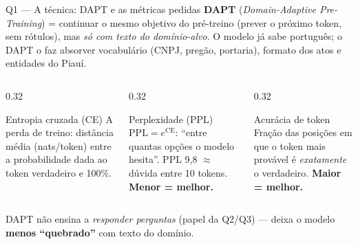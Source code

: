 \documentclass[10pt,aspectratio=169]{beamer}
\begin{document}
\begin{frame}{Q1 — A técnica: DAPT e as métricas pedidas}
  \textbf{DAPT} (\emph{Domain-Adaptive Pre-Training}) = continuar o mesmo objetivo do pré-treino
  (prever o próximo token, sem rótulos), mas \emph{só com texto do domínio-alvo}.
  O modelo já sabe português; o DAPT o faz absorver vocabulário (CNPJ, pregão, portaria),
  formato dos atos e entidades do Piauí.
  \vspace{6pt}
  \begin{columns}[T]
    \begin{column}{0.32\textwidth}
      \begin{block}{Entropia cruzada (CE)}
        \small A perda de treino: distância média (nats/token) entre a probabilidade dada ao token verdadeiro e 100\%.
      \end{block}
    \end{column}
    \begin{column}{0.32\textwidth}
      \begin{block}{Perplexidade (PPL)}
        \small $\mathrm{PPL} = e^{\mathrm{CE}}$: ``entre quantas opções o modelo hesita''.
        PPL 9,8 $\approx$ dúvida entre 10 tokens. \textbf{Menor = melhor.}
      \end{block}
    \end{column}
    \begin{column}{0.32\textwidth}
      \begin{block}{Acurácia de token}
        \small Fração das posições em que o token mais provável é \emph{exatamente} o verdadeiro.
        \textbf{Maior = melhor.}
      \end{block}
    \end{column}
  \end{columns}
  \vspace{6pt}
  \small DAPT não ensina a \emph{responder perguntas} (papel da Q2/Q3) — deixa o modelo
  \textbf{menos ``quebrado''} com texto do domínio.
\end{frame}
\end{document}

